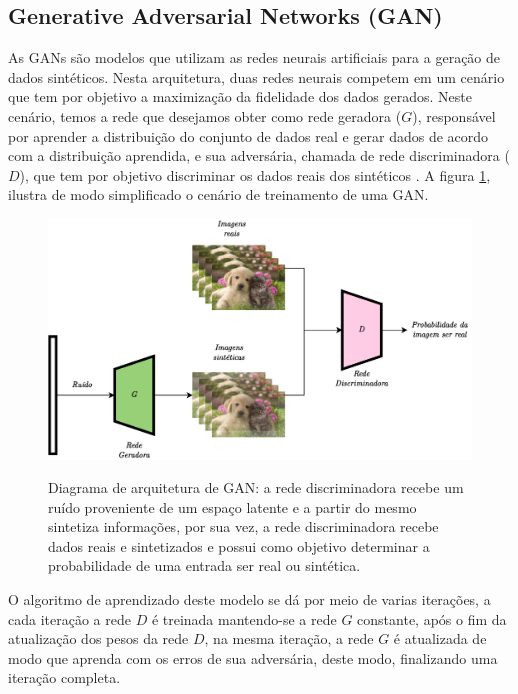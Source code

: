 \subsection{Generative Adversarial Networks (GAN)}

As GANs são modelos que utilizam as redes neurais artificiais para a geração de dados sintéticos. Nesta arquitetura, duas redes neurais competem em um cenário que tem por objetivo a maximização da fidelidade dos dados gerados. Neste cenário, temos a rede que desejamos obter como rede geradora ($G$), responsável por aprender a distribuição do conjunto de dados real e gerar dados de acordo com a distribuição aprendida, e sua adversária, chamada de rede discriminadora ($D$), que tem por objetivo discriminar os dados reais dos sintéticos \cite{goodfellowDeepLearning2016}. A figura \ref{fig:gan}, ilustra de modo simplificado o cenário de treinamento de uma GAN.

\begin{figure}[htbp]
	\centering
	\caption{Diagrama de arquitetura de GAN: a rede discriminadora recebe um ruído proveniente de um espaço latente e a partir do mesmo sintetiza informações, por sua vez, a rede discriminadora recebe dados reais e sintetizados e possui como objetivo determinar a probabilidade de uma entrada ser real ou sintética.}
		\includegraphics[scale=.25]{imagens/gan.png}
	\label{fig:gan}
\end{figure}

O algoritmo de aprendizado deste modelo se dá por meio de varias iterações, a cada iteração a rede $D$ é treinada mantendo-se a rede $G$ constante, após o fim da atualização dos pesos da rede $D$, na mesma iteração, a rede $G$ é atualizada de modo que aprenda com os erros de sua adversária, deste modo, finalizando uma iteração completa.

